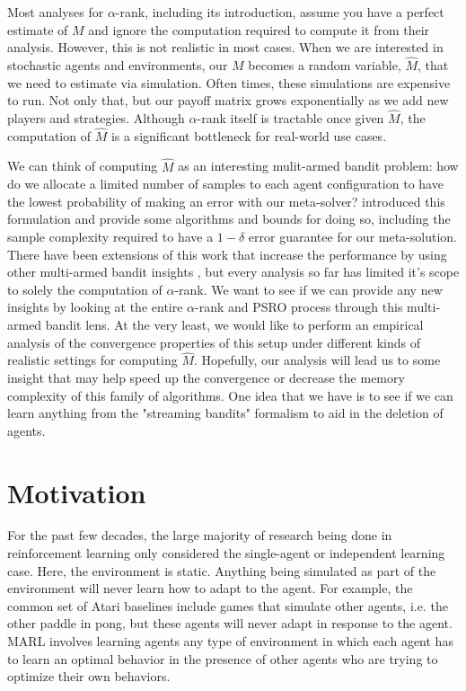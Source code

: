\documentclass{article}
\begin{document}
Most analyses for $\alpha$-rank, including its introduction, assume you have a
perfect estimate of $M$ and ignore the computation required to compute it from
their analysis. However, this is not realistic in most cases. When we
are interested in stochastic agents and environments, our $M$ becomes a random
variable, $\hat{M}$, that we need to estimate via simulation. Often times, these
simulations are expensive to run. Not only that, but our payoff matrix grows
exponentially as we add new players and strategies. Although $\alpha$-rank
itself is tractable once given $\hat{M}$, the computation of $\hat{M}$ is a
significant bottleneck for real-world use cases. \cite{alphalpha}

We can think of computing $\hat{M}$ as an interesting mulit-armed bandit
problem: how do we allocate a limited number of samples to each agent
configuration to have the lowest probability of making an error with our
meta-solver? \cite{goodone} introduced this formulation and provide some
algorithms and bounds for doing so, including the sample complexity required to
have a $1 - \delta$ error guarantee for our meta-solution. There have been
extensions of this work that increase the performance by using other multi-armed
bandit insights \cite{IM}, but every analysis so far has limited it's scope to
solely the computation of $\alpha$-rank. We want to see if we can provide any
new insights by looking at the entire $\alpha$-rank and PSRO process
\cite{alphaPSRO} through this multi-armed bandit lens. At the very least, we
would like to perform an empirical analysis of the convergence properties of
this setup under different kinds of realistic settings for computing $\hat{M}$.
Hopefully, our analysis will lead us to some insight that may help speed up the
convergence or decrease the memory complexity of this family of algorithms. One
idea that we have is to see if we can learn anything from the "streaming
bandits" formalism to aid in the deletion of agents.

\section{Motivation}
For the past few decades, the large majority of research being done in
reinforcement learning only considered the single-agent or independent learning
case. Here, the environment is static. Anything being simulated as part of the
environment will never learn how to adapt to the agent. For example, the common
set of Atari baselines \cite{atari} include games that simulate other agents,
i.e. the other paddle in pong, but these agents will never adapt in response to
the agent. MARL involves learning agents any type of environment in which each 
agent has to learn an optimal behavior in the presence of other agents who are
trying to optimize their own behaviors. 
\end{document}
